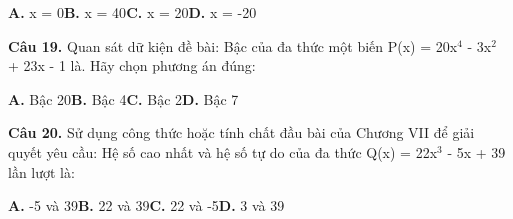 \documentclass[11pt,a4paper]{article}
\begin{document}
\hspace*{1.5em}\textbf{A.} x = 0\quad\quad \textbf{B.} x = 40\quad\quad \textbf{C.} x = 20\quad\quad \textbf{D.} x = -20\par\vspace{2pt}
\textbf{\color{primary} Câu 19.} Quan sát dữ kiện đề bài: Bậc của đa thức một biến P(x) = 20x$^4$ - 3x$^2$ + 23x - 1 là. Hãy chọn phương án đúng:\par
\hspace*{1.5em}\textbf{A.} Bậc 20\quad\quad \textbf{B.} Bậc 4\quad\quad \textbf{C.} Bậc 2\quad\quad \textbf{D.} Bậc 7\par\vspace{2pt}
\textbf{\color{primary} Câu 20.} Sử dụng công thức hoặc tính chất đầu bài của Chương VII để giải quyết yêu cầu: Hệ số cao nhất và hệ số tự do của đa thức Q(x) = 22x$^3$ - 5x + 39 lần lượt là:\par
\hspace*{1.5em}\textbf{A.} -5 và 39\quad\quad \textbf{B.} 22 và 39\quad\quad \textbf{C.} 22 và -5\quad\quad \textbf{D.} 3 và 39\par\vspace{2pt}
\end{document}
